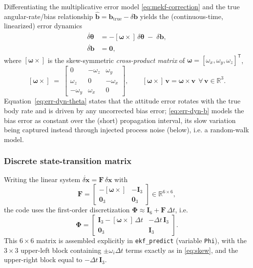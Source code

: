 \documentclass[11pt]{article}
\newcommand{\vect}[1]{\bm{#1}}
\newcommand{\mat}[1]{\bm{#1}}
\newcommand{\R}{\mathbb{R}}
\newcommand{\transpose}{^{\mathsf{T}}}
\newcommand{\skewm}[1]{\left[#1\times\right]}
\begin{document}
Differentiating the multiplicative error model \eqref{eq:mekf-correction} and the true angular-rate/bias relationship $\hat{\vect b} = \vect b_{\text{true}} - \delta\vect b$ yields the (continuous-time, linearized) error dynamics
\begin{align}
\dot{\delta\vect\theta} &= -\skewm{\vect\omega}\,\delta\vect\theta \;-\; \delta\vect b, \label{eq:err-dyn-theta}\\
\dot{\delta\vect b} &= \vect 0, \label{eq:err-dyn-b}
\end{align}
where $\skewm{\vect\omega}$ is the skew-symmetric \emph{cross-product matrix} of $\vect\omega=[\omega_x,\omega_y,\omega_z]\transpose$,
\begin{equation}
\skewm{\vect\omega} \;=\;
\begin{bmatrix}
0 & -\omega_z & \omega_y \\
\omega_z & 0 & -\omega_x \\
-\omega_y & \omega_x & 0
\end{bmatrix},
\qquad \skewm{\vect\omega}\,\vect v = \vect\omega\times\vect v \ \ \forall\, \vect v\in\R^3 .
\label{eq:skew}
\end{equation}
Equation~\eqref{eq:err-dyn-theta} states that the attitude error rotates with the true body rate and is driven by any uncorrected bias error; \eqref{eq:err-dyn-b} models the bias error as constant over the (short) propagation interval, its slow variation being captured instead through injected process noise (below), i.e. a random-walk model.

\subsubsection{Discrete state-transition matrix}

Writing the linear system $\dot{\delta\vect x} = \mat F\,\delta\vect x$ with
\begin{equation}
\mat F = \begin{bmatrix} -\skewm{\vect\omega} & -\mat I_3 \\ \mat 0_3 & \mat 0_3 \end{bmatrix} \in \R^{6\times6},
\end{equation}
the code uses the first-order discretization $\mat\Phi \approx \mat I_6 + \mat F\,\Delta t$, i.e.
\begin{equation}
\mat\Phi =
\left[
\begin{array}{c|c}
\mat I_3 - \skewm{\vect\omega}\,\Delta t & -\Delta t\, \mat I_3 \\ \hline
\mat 0_3 & \mat I_3
\end{array}
\right].
\label{eq:Phi}
\end{equation}
This $6\times 6$ matrix is assembled explicitly in \texttt{ekf\_predict} (variable \texttt{Phi}), with the $3\times3$ upper-left block containing $\pm\omega_i\Delta t$ terms exactly as in \eqref{eq:skew}, and the upper-right block equal to $-\Delta t\,\mat I_3$.
\end{document}
